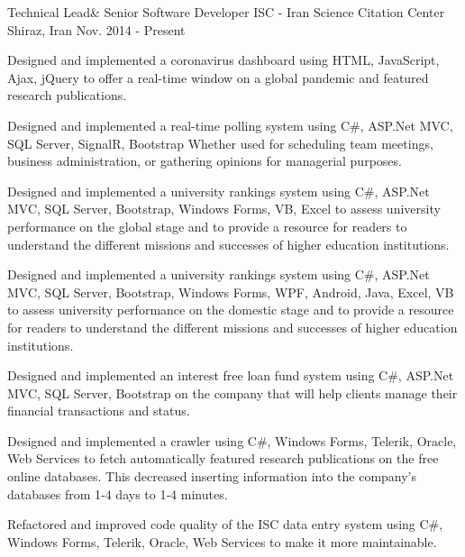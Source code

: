 


\begin{cventries}


\cventry
{Technical Lead\& Senior Software Developer} %
{ISC - Iran Science Citation Center} %
{Shiraz, Iran} %
{Nov. 2014 - Present} %
{ %
\begin{cvitems}
\item {Designed and implemented a coronavirus dashboard using HTML, JavaScript, Ajax, jQuery to offer a real-time window on a global pandemic and featured research publications.}
\item {Designed and implemented a real-time polling system using C\#, ASP.Net MVC, SQL Server, SignalR, Bootstrap Whether used for scheduling team meetings, business administration, or gathering opinions for managerial purposes.}
\item {Designed and implemented a university rankings system using C\#, ASP.Net MVC, SQL Server, Bootstrap, Windows Forms, VB, Excel to assess university performance on the global stage and to provide a resource for readers to understand the different missions and successes of higher education institutions.}
\item {Designed and implemented a university rankings system using C\#, ASP.Net MVC, SQL Server, Bootstrap, Windows Forms, WPF, Android, Java, Excel, VB to assess university performance on the domestic stage and to provide a resource for readers to understand the different missions and successes of higher education institutions.}
\item {Designed and implemented an interest free loan fund system using C\#, ASP.Net MVC, SQL Server, Bootstrap on the company that will help clients manage their financial transactions and status.}
\item {Designed and implemented a crawler using C\#, Windows Forms, Telerik, Oracle, Web Services to fetch automatically featured research publications on the free online databases. This decreased inserting information into the company's databases from 1‑4 days to 1‑4 minutes.}
\item {Refactored and improved code quality of the ISC data entry system using C\#, Windows Forms, Telerik, Oracle, Web Services to make it more maintainable.}
\end{cvitems}
}


\end{cventries}